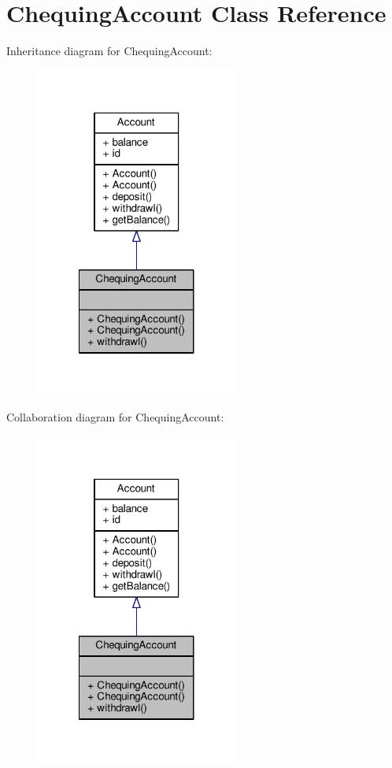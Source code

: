 \hypertarget{classChequingAccount}{\section{Chequing\-Account Class Reference}
\label{classChequingAccount}
}


Inheritance diagram for Chequing\-Account\-:
\nopagebreak
\begin{figure}[H]
\begin{center}
\leavevmode
\includegraphics[width=188pt]{classChequingAccount__inherit__graph}
\end{center}
\end{figure}


Collaboration diagram for Chequing\-Account\-:
\nopagebreak
\begin{figure}[H]
\begin{center}
\leavevmode
\includegraphics[width=188pt]{classChequingAccount__coll__graph}
\end{center}
\end{figure}
